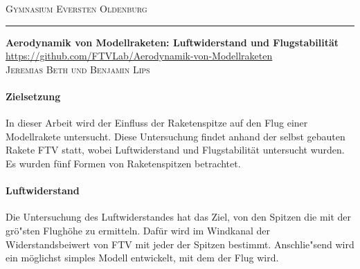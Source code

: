 \documentclass[11pt,a4paper]{article}
\begin{document}
\thispagestyle{empty}


{\scshape\large\centering Gymnasium Eversten Oldenburg \\}
\vspace{-10pt}
\noindent\rule{\textwidth}{0.5pt} %
\vspace{5pt}
{\large\bfseries\centering Aerodynamik von Modellraketen: Luftwiderstand und Flugstabilität \\}
\vspace{-6pt}
{\centering \url{https://github.com/FTVLab/Aerodynamik-von-Modellraketen} \\}
\vspace{-2pt}
{\centering\sffamily\scshape Jeremias Beth und Benjamin Lips \\}

\vspace{-5pt}
\paragraph{Zielsetzung}
In dieser Arbeit wird der Einfluss der Raketenspitze auf den Flug einer Modellrakete untersucht. Diese Untersuchung findet anhand der selbst gebauten Rakete FTV statt, wobei Luftwiderstand und Flugstabilität untersucht wurden. Es wurden fünf Formen von Raketenspitzen betrachtet.

\vspace{-10pt}
\paragraph{Luftwiderstand}
Die Untersuchung des Luftwiderstandes hat das Ziel, von den Spitzen die mit der grö"sten Flughöhe zu ermitteln. Dafür wird im Windkanal der Widerstandsbeiwert von FTV mit jeder der Spitzen bestimmt. Anschlie"send wird ein möglichst simples Modell entwickelt, mit dem der Flug wird. 
\end{document}
